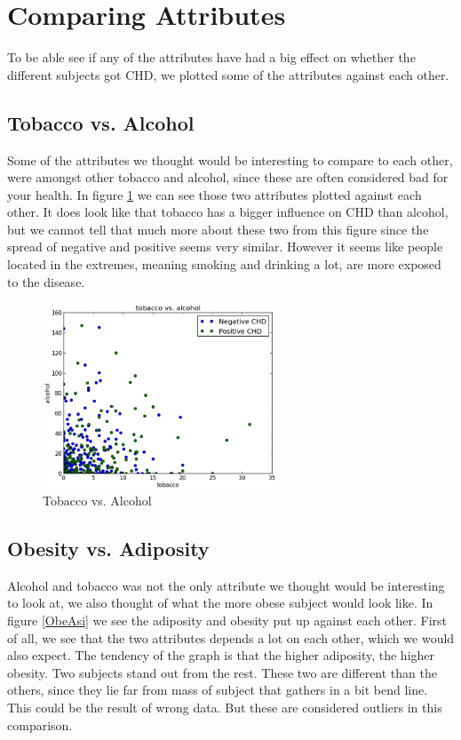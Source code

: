 \section{Comparing Attributes}
To be able see if any of the attributes have had a big effect on whether the different subjects got CHD, we plotted some of the attributes against each other.

\subsection{Tobacco vs. Alcohol}

Some of the attributes we thought would be interesting to compare to each other, were amongst other tobacco and alcohol, since these are often considered bad for your health. In figure \ref{AlcoTobac} we can see those two attributes plotted against each other. It does look like that tobacco has a bigger influence on CHD than alcohol, but we cannot tell that much more about these two from this figure since the spread of negative and positive seems very similar. However it seems like people located in the extremes, meaning smoking and drinking a lot, are more exposed to the disease.

\begin{figure}[H]
\centering
\includegraphics[width=7cm, keepaspectratio=true]{pictures/tobaccoAlcohol.png}
\vspace{-0.4cm}
\caption{\footnotesize Tobacco vs. Alcohol}
\label{AlcoTobac}
\end{figure}

\subsection{Obesity vs. Adiposity}

Alcohol and tobacco was not the only attribute we thought would be interesting to look at, we also thought of what the more obese subject would look like. In figure \ref{ObeAsi} we see the adiposity and obesity put up against each other. First of all, we see that the two attributes depends a lot on each other, which we would also expect. The tendency of the graph is that the higher adiposity, the higher obesity. Two subjects stand out from the rest. These two are different than the others, since they lie far from mass of subject that gathers in a bit bend line. This could be the result of wrong data. But these are considered outliers in this comparison.


